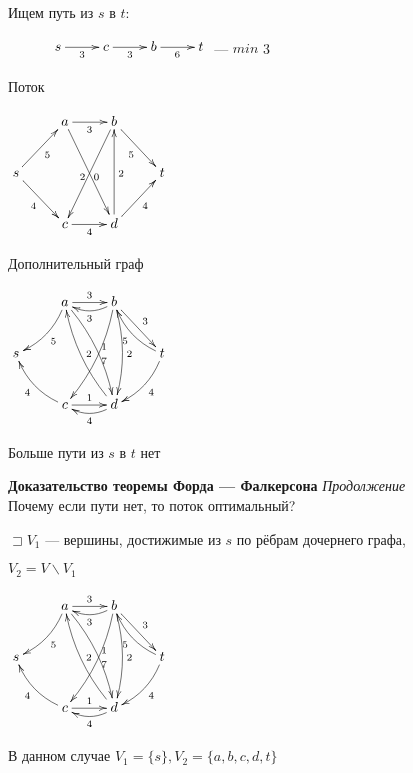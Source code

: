 \documentclass[a4paper, 12pt] {article}
\begin{document}
Ищем путь из $ s $ в $ t :$

$\begin{matrix}
	\xymatrix{
		& s  \ar@{->}[r]_3 & c \ar@{->}[r]_3 & b \ar@{->}[r]_6 & t \\
	}
\end{matrix}$ --- $ min $ 3

\newpage
Поток

$\begin{matrix}
	\xymatrix{
		& a  \ar@{->}[r]_3 \ar@{->}[rdd]_2 & b \ar@{->}[rd]_5 \\
		s \ar@{->}[rd]_4 \ar@{->}[ru]_5 &  & & t \\
		& c \ar@{->}[r]_4 \ar@{<-}[ruu]_0 & d \ar@{->}[ru]_4 \ar@{->}[uu]_2 \\
	}
\end{matrix}$

Дополнительный граф

$\begin{matrix}
	\xymatrix{
		& a  \ar@{->}[r]^3 \ar@/^/[ld]^5 \ar@/^/[rdd]^1  & b \ar@/^/[l]^3 \ar@{->}[rd]^3 \ar@/^/[ldd]^7 \ar@/^/[dd]^2 \\
		s    &  & & t \ar@/^/[lu]^5 \ar@/^/[ld]^4\\
		& c \ar@{->}[r]^1 \ar@/^/[lu]^4   & d \ar@/^/[l]^4  \ar@/^/[luu]_2 \\
	}
\end{matrix}$

Больше пути из $ s $ в $ t $ нет

\newpage

\textbf{Доказательство теоремы Форда — Фалкерсона} \textit{Продолжение}\\

Почему если пути нет, то поток оптимальный?

$ \sqsupset V_{1} $ --- вершины, достижимые из $ s $ по рёбрам дочернего графа, 

$ V_{2} = V \backslash V_{1} $

$\begin{matrix}
	\xymatrix{
		& a  \ar@{->}[r]^3 \ar@/^/[ld]^5 \ar@/^/[rdd]^1  & b \ar@/^/[l]^3 \ar@{->}[rd]^3 \ar@/^/[ldd]^7 \ar@/^/[dd]^2 \\
		s    &  & & t \ar@/^/[lu]^5 \ar@/^/[ld]^4\\
		& c \ar@{->}[r]^1 \ar@/^/[lu]^4   & d \ar@/^/[l]^4  \ar@/^/[luu]_2 \\
	}
\end{matrix}$

В данном случае $ V_{1} = \{s\}, V_{2} = \{a, b, c, d, t\} $
\end{document}
